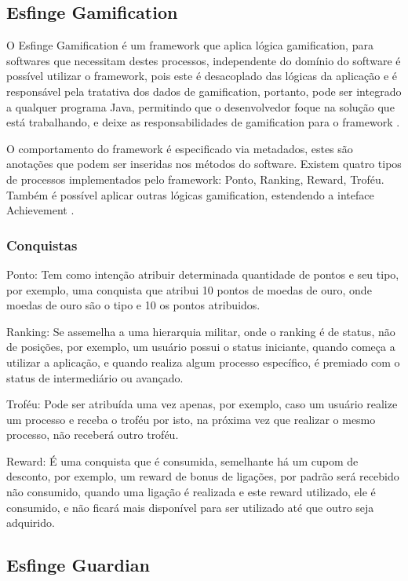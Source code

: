 \subsection{Esfinge Gamification}

\par O Esfinge Gamification é um framework que aplica lógica gamification, para softwares que necessitam destes processos, independente do domínio do software é possível utilizar o framework, pois este é desacoplado das lógicas da aplicação e é responsável pela tratativa dos dados de gamification, portanto, pode ser integrado a qualquer programa Java, permitindo que o desenvolvedor foque na solução que está trabalhando, e deixe as responsabilidades de gamification para o framework  \cite{esfinge2011}.
\par O comportamento do framework é especificado via metadados, estes são anotações que podem ser inseridas nos métodos do software. Existem quatro tipos de processos implementados pelo framework: Ponto, Ranking, Reward, Troféu. Também é possível aplicar outras lógicas gamification, estendendo a inteface Achievement  \cite{esfinge2011}.

\subsubsection{Conquistas}

\par Ponto: Tem como intenção atribuir determinada quantidade de pontos e seu tipo, por exemplo, uma conquista que atribui 10 pontos de moedas de ouro, onde moedas de ouro são o tipo e 10 os pontos atribuidos. 
\par Ranking: Se assemelha a uma hierarquia militar, onde o ranking é de status, não de posições, por exemplo, um usuário possui o status iniciante, quando começa a utilizar a aplicação, e quando realiza algum processo específico, é premiado com o status de intermediário ou avançado. 
\par Troféu: Pode ser atribuída uma vez apenas, por exemplo, caso um usuário realize um processo e receba o troféu por isto, na próxima vez que realizar o mesmo processo, não receberá outro troféu. 
\par Reward: É uma conquista que é consumida, semelhante há um cupom de desconto, por exemplo, um reward de bonus de ligações, por padrão será recebido não consumido, quando uma ligação é realizada e este reward utilizado, ele é consumido, e não ficará mais disponível para ser utilizado até que outro seja adquirido.

\subsection{Esfinge Guardian}
